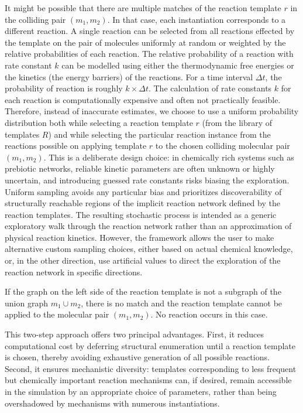 It might be possible that there are multiple matches of the reaction template $r$ in the colliding pair $(m_1, m_2)$. In that case, each instantiation corresponds to a different reaction. A single reaction can be selected from all reactions effected by the template on the pair of molecules uniformly at random or weighted by the relative probabilities of each reaction.
The relative probability of a reaction with rate constant $k$ can be modelled using either the thermodynamic free energies or the kinetics (the energy barriers) of the reactions. For a time interval $\Delta t$, the probability of reaction is roughly $k\times \Delta t$. The calculation of rate constants $k$ for each reaction is computationally expensive and often not practically feasible. Therefore, instead of inaccurate estimates, we choose to use a uniform probability distribution both while selecting a reaction template $r$ (from the library of templates $R$) and while selecting the particular reaction instance from the reactions possible on applying template $r$ to the chosen colliding molecular pair $(m_1, m_2)$. 
This is a deliberate design choice: in chemically rich systems such as prebiotic networks, reliable kinetic parameters are often unknown or highly uncertain,
and introducing guessed rate constants risks biasing the exploration.
Uniform sampling avoids any particular bias and prioritizes discoverability of structurally reachable regions of the implicit reaction network defined by the reaction templates. The resulting stochastic process is intended as a generic exploratory walk through the reaction network rather than an approximation of physical reaction kinetics. However, the framework allows the user to make alternative custom sampling choices, either based on actual chemical knowledge, or, in the other direction, use artificial values to direct the exploration of the reaction network in specific directions.

If the graph on the left side of the reaction template is not a subgraph of the union graph $m_1 \cup m_2$, there is no match and the reaction template cannot be applied to the molecular pair $(m_1, m_2)$. No reaction occurs in this case.

This two-step approach offers two principal advantages.
First, it reduces computational cost by deferring structural enumeration until a reaction template is chosen,
thereby avoiding exhaustive generation of all possible reactions.
Second, it ensures mechanistic diversity: templates corresponding to less frequent but chemically important reaction mechanisms can,
if desired, remain accessible in the simulation by an appropriate choice of parameters, rather than being overshadowed by mechanisms with numerous instantiations.

